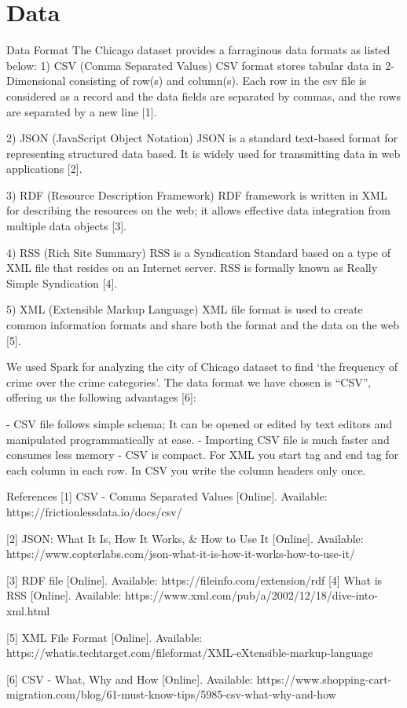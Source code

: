 \section{Data}

Data Format 
The Chicago dataset provides a farraginous data formats as listed below:
1) CSV (Comma Separated Values) 
CSV format stores tabular data in 2-Dimensional consisting of row(s) and column(s). Each row in the csv file is considered as a record and the data fields are separated by commas, and the rows are separated by a new line [1].

2) JSON (JavaScript Object Notation) 
JSON is a standard text-based format for representing structured data based. It is widely used for transmitting data in web applications [2].

3) RDF (Resource Description Framework)
	RDF framework is written in XML for describing the resources on the web; it allows effective data integration from multiple data objects [3].
	
4) RSS (Rich Site Summary)
	RSS is a Syndication Standard based on a type of XML file that resides on an Internet server. RSS is formally known as Really Simple Syndication [4].

5) XML (Extensible Markup Language)
	XML file format is used to create common information formats and share both the format and the data on the web [5].

We used Spark for analyzing the city of Chicago dataset to find ‘the frequency of crime over the crime categories’. The data format we have chosen is “CSV”, offering us the following advantages [6]:

-	CSV file follows simple schema; It can be opened or edited by text editors and manipulated programmatically at ease.
-	Importing CSV file is much faster and consumes less memory
-	CSV is compact. For XML you start tag and end tag for each column in each row. In CSV you write the column headers only once.



 
References
[1] CSV - Comma Separated Values [Online]. Available: https://frictionlessdata.io/docs/csv/

[2] JSON: What It Is, How It Works, & How to Use It [Online]. Available: https://www.copterlabs.com/json-what-it-is-how-it-works-how-to-use-it/

[3] RDF file [Online]. Available: https://fileinfo.com/extension/rdf
[4] What is RSS [Online]. Available: https://www.xml.com/pub/a/2002/12/18/dive-into-xml.html

[5] XML File Format [Online]. Available:
https://whatis.techtarget.com/fileformat/XML-eXtensible-markup-language

[6] CSV - What, Why and How [Online]. Available:
https://www.shopping-cart-migration.com/blog/61-must-know-tips/5985-csv-what-why-and-how
